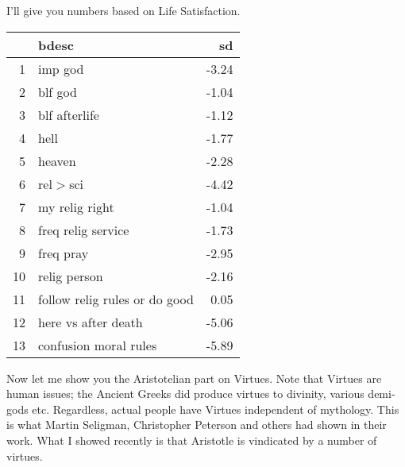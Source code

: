 \documentclass{amsart}
\begin{document}
I'll give you numbers based on Life Satisfaction.

\begin{table}[ht]
\centering
\begin{tabular}{rlr}
  \hline
 & bdesc & sd \\ 
  \hline
1 & imp god & -3.24 \\ 
  2 & blf god & -1.04 \\ 
  3 & blf afterlife & -1.12 \\ 
  4 & hell & -1.77 \\ 
  5 & heaven & -2.28 \\ 
  6 & rel$>$sci & -4.42 \\ 
  7 & my relig right & -1.04 \\ 
  8 & freq relig service & -1.73 \\ 
  9 & freq pray & -2.95 \\ 
  10 & relig person & -2.16 \\ 
  11 & follow relig rules or do good & 0.05 \\ 
  12 & here vs after death & -5.06 \\ 
  13 & confusion moral rules & -5.89 \\ 
   \hline
\end{tabular}
\end{table}


Now let me show you the Aristotelian part on Virtues.  Note that Virtues are human issues; the Ancient Greeks did produce virtues to divinity, various demi-gods etc.   Regardless, actual people have Virtues independent of mythology.  This is what Martin Seligman, Christopher Peterson and others had shown in their work.  What I showed recently is that Aristotle is vindicated by a number of virtues.
\end{document}

